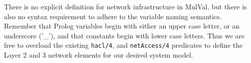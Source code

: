 

There is no explicit definition for network infrastructure in MulVal, but there is also no syntax requirement to adhere to the variable naming semantics. Remember that Prolog variables begin with either an upper case letter, or an underscore ('\_'),  and that constants begin with lower case letters. Thus we are free to overload the existing \verb|hacl/4|, and \verb|netAccess/4| predicates to define the Layer 2 and 3 network elements for our desired system model.


